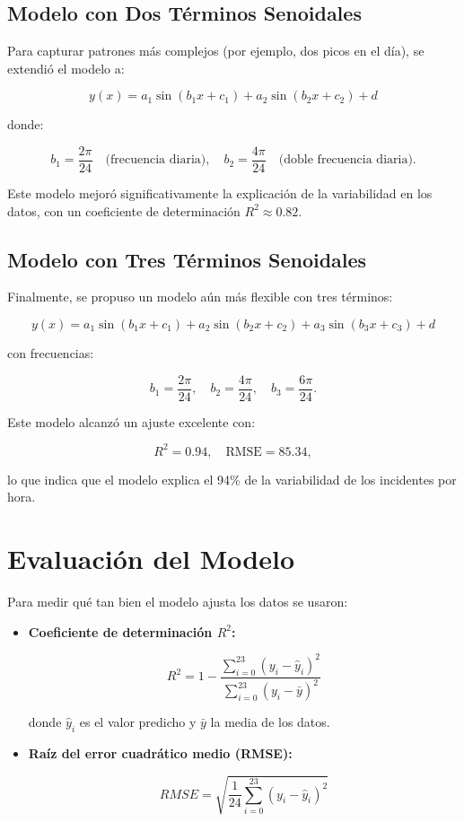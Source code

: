 \documentclass[a4paper,12pt]{article}
\begin{document}
\subsection{Modelo con Dos Términos Senoidales}

Para capturar patrones más complejos (por ejemplo, dos picos en el día), se extendió el modelo a:

\[
y(x) = a_1 \sin(b_1 x + c_1) + a_2 \sin(b_2 x + c_2) + d
\]

donde:

\[
b_1 = \frac{2\pi}{24} \quad \text{(frecuencia diaria)}, \quad b_2 = \frac{4\pi}{24} \quad \text{(doble frecuencia diaria)}.
\]

Este modelo mejoró significativamente la explicación de la variabilidad en los datos, con un coeficiente de determinación \( R^2 \approx 0.82 \).

\subsection{Modelo con Tres Términos Senoidales}

Finalmente, se propuso un modelo aún más flexible con tres términos:

\[
y(x) = a_1 \sin(b_1 x + c_1) + a_2 \sin(b_2 x + c_2) + a_3 \sin(b_3 x + c_3) + d
\]

con frecuencias:

\[
b_1 = \frac{2\pi}{24}, \quad b_2 = \frac{4\pi}{24}, \quad b_3 = \frac{6\pi}{24}.
\]

Este modelo alcanzó un ajuste excelente con:

\[
R^2 = 0.94, \quad \text{RMSE} = 85.34,
\]

lo que indica que el modelo explica el 94\% de la variabilidad de los incidentes por hora.

\section{Evaluación del Modelo}

Para medir qué tan bien el modelo ajusta los datos se usaron:

\begin{itemize}
    \item \textbf{Coeficiente de determinación \( R^2 \):}

    \[
    R^2 = 1 - \frac{\sum_{i=0}^{23} (y_i - \hat{y}_i)^2}{\sum_{i=0}^{23} (y_i - \bar{y})^2}
    \]

    donde \( \hat{y}_i \) es el valor predicho y \( \bar{y} \) la media de los datos.

    \item \textbf{Raíz del error cuadrático medio (RMSE):}

    \[
    RMSE = \sqrt{\frac{1}{24} \sum_{i=0}^{23} (y_i - \hat{y}_i)^2}
    \]
\end{itemize}
\end{document}
